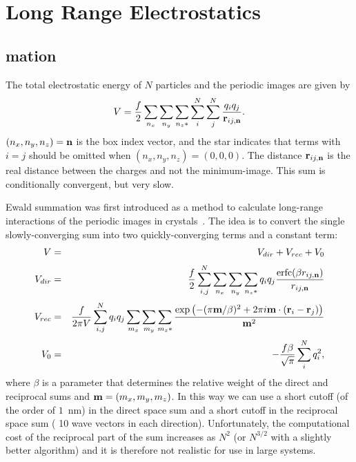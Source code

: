 \section{Long Range Electrostatics}
\label{sec:lr_elstat}
\subsection{mation}
\label{sec:ewald}
The total electrostatic energy of $N$ particles and the periodic
images are given by
\begin{equation}
V=\frac{f}{2}\sum_{n_x}\sum_{n_y}
\sum_{n_{z}*} \sum_{i}^{N} \sum_{j}^{N} 
\frac{q_i q_j}{{\bf r}_{ij,{\bf n}}}.
\label{eqn:totalcoulomb}
\end{equation}
$(n_x,n_y,n_z)={\bf n}$ is the box index vector, and the star indicates that
terms with $i=j$ should be omitted when $(n_x,n_y,n_z)=(0,0,0)$. The
distance ${\bf r}_{ij,{\bf n}}$ is the real distance between the charges and
not the minimum-image. This sum is conditionally convergent, but 
very slow.

Ewald summation was first introduced as a method to calculate
long-range interactions of the periodic images in
crystals~\cite{Ewald21}. The idea is to convert the single
slowly-converging sum  into two
quickly-converging terms and a constant term:
\begin{eqnarray}
V &=& V_{dir} + V_{rec} + V_{0} \\[0.5ex]
V_{dir} &=& \frac{f}{2} \sum_{i,j}^{N} 
\sum_{n_x}\sum_{n_y}
\sum_{n_{z}*} q_i q_j \frac{\mbox{erfc}(\beta {r}_{ij,{\bf n}} )}{{r}_{ij,{\bf n}}} \\[0.5ex]
V_{rec} &=& \frac{f}{2 \pi V} \sum_{i,j}^{N} q_i q_j 
\sum_{m_x}\sum_{m_y}
\sum_{m_{z}*} \frac{\exp{\left( -(\pi {\bf m}/\beta)^2 + 2 \pi i
      {\bf m} \cdot ({\bf r}_i - {\bf r}_j)\right)}}{{\bf m}^2} \\[0.5ex]
V_{0} &=& -\frac{f \beta}{\sqrt{\pi}}\sum_{i}^{N} q_i^2,
\end{eqnarray}
where $\beta$ is a parameter that determines the relative weight of the
direct and reciprocal sums and ${\bf m}=(m_x,m_y,m_z)$.
In this way we can use a short cutoff (of the order of $1$~nm) in the direct space sum and a
short cutoff in the reciprocal space sum ({\eg} 10 wave vectors in each 
direction). Unfortunately, the computational cost of the reciprocal
part of the sum increases as $N^2$
(or $N^{3/2}$ with a slightly better algorithm) and it is therefore not 
realistic for use in large systems.

